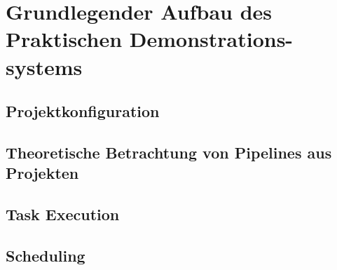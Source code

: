 \chapter{Grundlegender Aufbau des Praktischen Demonstrations-systems}
\section{Projektkonfiguration}
\section{Theoretische Betrachtung von Pipelines aus Projekten}
\section{Task Execution}
\section{Scheduling}
